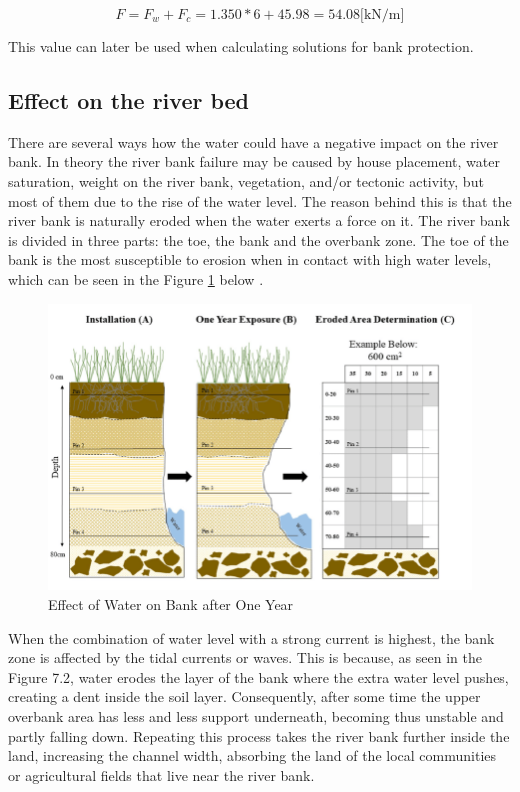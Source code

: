 $$
F = F_w + F_c = 1.350*6 + 45.98 = 54.08 \text{[kN/m]}
$$

This value can later be used when calculating solutions for bank protection. 

\subsection{Effect on the river bed}
\label{chap 6: effect on the river bed}
There are several ways how the water could have a negative impact on the river bank. In theory the river bank failure may be caused by house placement, water saturation, weight on the river bank, vegetation, and/or tectonic activity, but most of them due to the rise of the water level. The reason behind this is that the river bank is naturally eroded when the water exerts a force on it.
The river bank is divided in three parts: the toe, the bank and the overbank zone. The toe of the bank is the most susceptible to erosion when in contact with high water levels, which can be seen in the Figure \ref{fig:Effect of Water on Bank after One Year} below \autocite{governmentofsouthaustraliaRiverbankCollapse2024}.

\begin{figure}[H]
    \centering
    \includegraphics[width=0.5\linewidth]{figures/ch2/Erosion.png}
    \caption{Effect of Water on Bank after One Year}
    \label{fig:Effect of Water on Bank after One Year}
\end{figure}

When the combination of water level with a strong current is highest, the bank zone is affected by the tidal currents or waves. This is because, as seen in the Figure 7.2, water erodes the layer of the bank where the extra water level pushes, creating a dent inside the soil layer.
Consequently, after some time the upper overbank area has less and less support underneath, becoming thus unstable and partly falling down. 
Repeating this process takes the river bank further inside the land, increasing the channel width, absorbing the land of the local communities or agricultural fields that live near the river bank.


